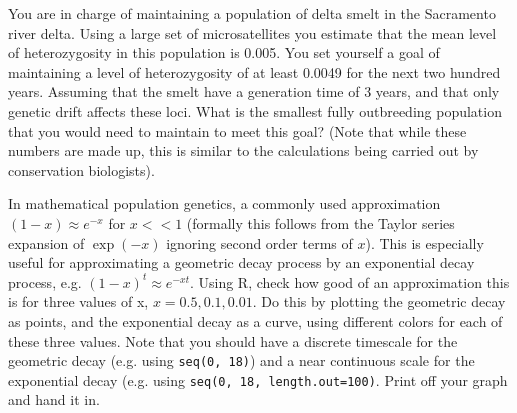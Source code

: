 
\begin{question} You are in charge of maintaining a population of delta smelt
  in the Sacramento river delta. Using a large set of microsatellites you
  estimate that the mean level of heterozygosity in this population is 0.005.
  You set yourself a goal of maintaining a level of heterozygosity of at least
  0.0049 for the next two hundred years. Assuming that the smelt have a
  generation time of 3 years, and that only genetic drift affects these loci.
  What is the smallest fully outbreeding population that you would need to
maintain to meet this goal?  (Note that while these numbers are made up, this
is similar to the calculations being carried out by conservation biologists).
\end{question}

\begin{question} \label{geo_question} In mathematical population genetics, a
  commonly used approximation $(1-x) \approx e^{-x}$ for $x << 1$ (formally
  this follows from the Taylor series expansion of $\exp(-x)$ ignoring second
  order terms of $x$).  This is especially useful for approximating a geometric
  decay process by an exponential decay process, e.g. $(1 - x)^t \approx
  e^{-xt}$. Using R, check how good of an approximation this is for three
  values of x, $x = 0.5, 0.1, 0.01$. Do this by plotting the geometric decay as
  points, and the exponential decay as a curve, using different colors for each
  of these three values. Note that you should have a discrete timescale for the
  geometric decay (e.g. using \texttt{seq(0, 18)}) and a near continuous scale
  for the exponential decay (e.g. using \texttt{seq(0, 18, length.out=100)}.
  Print off your graph and hand it in. 


\end{question}

